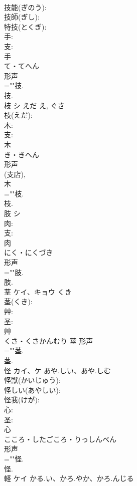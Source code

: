 \documentclass[8pt]{extreport}
\begin{document}
\begin{CJK}{UTF8}{min}
\\	技能(ぎのう): 
\\	技師(ぎし): 
\\	特技(とくぎ): 
\\	手: 
\\	支: 
\\	手	
\\	て・てへん	
\\	形声 
\\	=""技.
\\	技.
\\	枝	シ	えだ	え, ぐさ	
\\	枝(えだ): 
\\	木: 
\\	支: 
\\	木	
\\	き・きへん	
\\	形声 
\\	(支店), 
\\	木 
\\	=""枝.
\\	枝.
\\	肢	シ			
\\	肉: 
\\	支: 
\\	肉	
\\	にく・にくづき	
\\	形声 
\\	=""肢.
\\	肢.
\\	茎	ケイ、キョウ	くき		
\\	茎(くき): 
\\	艸: 
\\	圣: 
\\	艸	
\\	くさ・くさかんむり	莖	形声 
\\	=""茎.
\\	茎.
\\	怪	カイ、ケ	あや.しい、あや.しむ		
\\	怪獣(かいじゅう): 
\\	怪しい(あやしい): 
\\	怪我(けが): 
\\	心: 
\\	圣: 
\\	心	
\\	こころ・したごころ・りっしんべん	
\\	形声 
\\	=""怪.
\\	怪.
\\	軽	ケイ	かる.い、かろ.やか、かろ.んじる		

\end{CJK}
\end{document}
